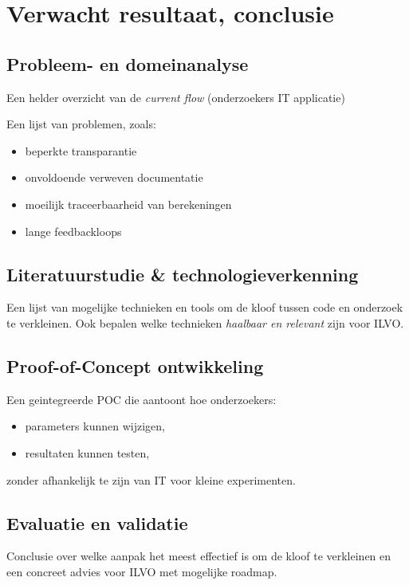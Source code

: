 \section{Verwacht resultaat, conclusie}%
\label{sec:verwachte_resultaten}




\subsection{Probleem- en domeinanalyse}
Een helder overzicht van de \textit{current flow} (onderzoekers \rightarrow  IT \rightarrow  applicatie)

Een lijst van problemen, zoals:
\begin{itemize}
	\item beperkte transparantie
	\item onvoldoende verweven documentatie
	\item moeilijk traceerbaarheid van berekeningen
	\item lange feedbackloops
\end{itemize}

\subsection{Literatuurstudie \& technologieverkenning}
Een lijst van mogelijke technieken en tools om de kloof tussen code en onderzoek te verkleinen.
Ook bepalen welke technieken \textit{haalbaar en relevant} zijn voor ILVO.\@


\subsection{Proof-of-Concept ontwikkeling}
Een geintegreerde POC die aantoont hoe onderzoekers:
\begin{itemize}
	\item parameters kunnen wijzigen,
	\item resultaten kunnen testen,
\end{itemize}
zonder afhankelijk te zijn van IT voor kleine experimenten.

\subsection{Evaluatie en validatie}
Conclusie over welke aanpak het meest effectief is om de kloof te verkleinen en een concreet advies voor ILVO met mogelijke roadmap.
